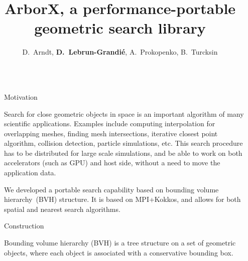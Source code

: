 \documentclass[final,hyperref={pdfpagelabels=false}]{beamer}
\title{\huge ArborX, a performance-portable geometric search library}
\author{D.~Arndt, \textbf{D.~Lebrun-Grandi{\'e}}, A.~Prokopenko, B.~Turcksin}
\institute{Oak Ridge National Laboratory}
\begin{document}

\begin{frame}[t,fragile]

\begin{columns}[t]

\begin{column}{.02\textwidth}\end{column}

\begin{column}{.450\textwidth}

\begin{block}{\centering Motivation}

  Search for close geometric objects in space is an important algorithm of many
  scientific applications.
  Examples include computing interpolation for overlapping meshes, finding
  mesh intersections, iterative closest point algorithm, collision detection, particle simulations, etc.
  This search procedure has to be distributed for large scale simulations, and
  be able to work on both accelerators (such as GPU) and host side, without a
  need to move the application data.

  We developed a portable search capability based on bounding volume
  hierarchy~(BVH) structure. It is based on MPI+Kokkos, and allows for both
  spatial and nearest search algorithms.
\end{block}

\begin{block}{\centering Construction}

  Bounding volume hierarchy (BVH) is a tree structure on a set of geometric
  objects, where each object is associated with a conservative bounding box.


\end{block}
\end{column}
\end{columns}
\end{frame}
\end{document}
